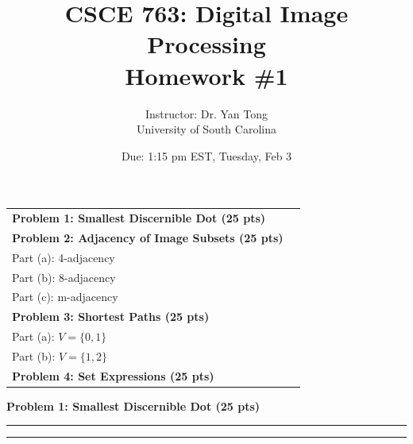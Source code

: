 \documentclass[12pt]{article}
\title{CSCE 763: Digital Image Processing \\ Homework \#1}
\author{Instructor: Dr. Yan Tong \\ University of South Carolina}
\date{Due: 1:15 pm EST, Tuesday, Feb 3}
\newcommand{\question}[1]{%
  \clearpage
  \vspace{0.5cm}
  {\noindent\normalsize \textbf{#1}}
  \vspace{0.2cm}
  \hrule
  \vspace{0.1cm}
  \hrule
  \vspace{0.3cm}
}
\begin{document}
\maketitle
\setlength{\parindent}{0pt}



\begin{center}
\begin{tcolorbox}[colback=white, colframe=gray!50!black, colbacktitle=gray!20!white,
                  coltitle=black, sharp corners, boxrule=1pt,
                  title=\Large\bfseries Table of Contents]
\begin{tabular}{p{}r}
\textbf{Problem 1: Smallest Discernible Dot (25 pts)} \dotfill & \textbf{\pageref{quest:1}} \\[0.3em]
\textbf{Problem 2: Adjacency of Image Subsets (25 pts)} & \\
\quad Part (a): 4-adjacency \dotfill & \textbf{\pageref{quest:2}} \\
\quad Part (b): 8-adjacency \dotfill & \textbf{\pageref{quest:2}} \\
\quad Part (c): m-adjacency \dotfill & \textbf{\pageref{quest:2}} \\[0.3em]
\textbf{Problem 3: Shortest Paths (25 pts)} & \\
\quad Part (a): $V = \{0, 1\}$ \dotfill & \textbf{\pageref{quest:3}} \\
\quad Part (b): $V = \{1, 2\}$ \dotfill & \textbf{\pageref{quest:3}} \\[0.3em]
\textbf{Problem 4: Set Expressions (25 pts)} \dotfill & \textbf{\pageref{quest:4}} \\
\end{tabular}
\vspace{0.2cm}
\end{tcolorbox}
\end{center}

\vspace{0.5cm}


\question{Problem 1: Smallest Discernible Dot (25 pts)}\label{quest:1}
\end{document}
